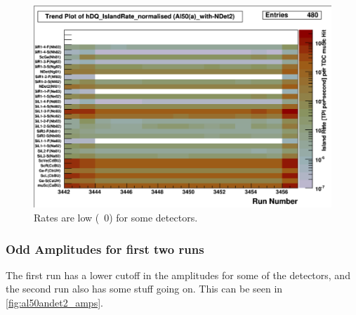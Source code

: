 \documentclass[a4paper]{article}
\begin{document}
\begin{figure}
  \centering
  \includegraphics[width=0.9\linewidth]{figs/al50andet2/rates}
  \caption{Rates are low (~0) for some detectors.}
  \label{fig:al50andet2_rates}
\end{figure}


\subsubsection{Odd Amplitudes for first two runs}
\label{sec:al50andet2_amps}

The first run has a lower cutoff in the amplitudes for some of the detectors, and the second run also has some stuff going on. This
can be seen in \ref{fig:al50andet2_amps}.
\end{document}
